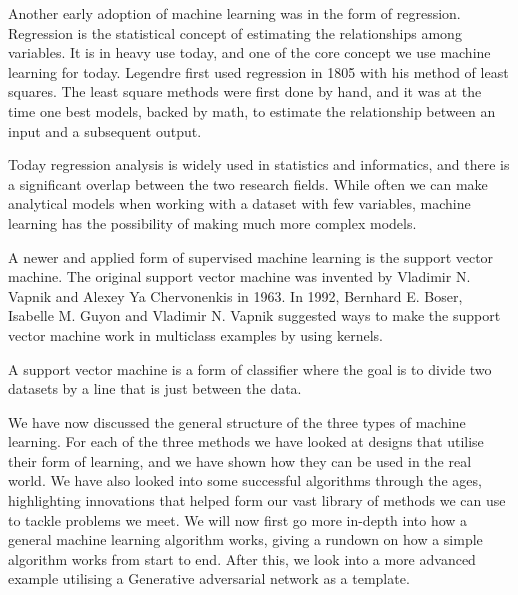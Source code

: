 Another early adoption of machine learning was in the form of regression. Regression is the statistical concept of estimating the relationships among variables. It is in heavy use today, and one of the core concept we use machine learning for today. 
Legendre first used regression in 1805 with his method of least squares. The least square methods were first done by hand, and it was at the time one best models, backed by math, to estimate the relationship between an input and a subsequent output. 

Today regression analysis is widely used in statistics and informatics, and there is a significant overlap between the two research fields. While often we can make analytical models when working with a dataset with few variables, machine learning has the possibility of making much more complex models.

\vspace{5px}

A newer and applied form of supervised machine learning is the support vector machine. The original support vector machine was invented by Vladimir N. Vapnik and Alexey Ya Chervonenkis in 1963.  
In 1992, Bernhard E. Boser, Isabelle M. Guyon and Vladimir N. Vapnik suggested ways to make the support vector machine work in multiclass examples by using kernels.  

A support vector machine is a form of classifier where the goal is to divide two datasets by a line that is just between the data. 


\vspace{5px} 


    
We have now discussed the general structure of the three types of machine learning. For each of the three methods we have looked at designs that utilise their form of learning, and we have shown how they can be used in the real world.
We have also looked into some successful algorithms through the ages, highlighting innovations that helped form our vast library of methods we can use to tackle problems we meet.
We will now first go more in-depth into how a general machine learning algorithm works, giving a rundown on how a simple algorithm works from start to end.
After this, we look into a more advanced example utilising a Generative adversarial network as a template.


    
